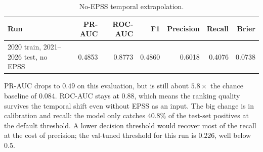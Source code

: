 \documentclass[11pt]{article}
\begin{document}
\begin{table}[h]
\centering
\small
\begin{tabular}{lrrrrrr}
\toprule
Run & PR-AUC & ROC-AUC & F1 & Precision & Recall & Brier \\
\midrule
2020 train, 2021--2026 test, no EPSS & 0.4853 & 0.8773 & 0.4860 & 0.6018 & 0.4076 & 0.0738 \\
\bottomrule
\end{tabular}
\caption{No-EPSS temporal extrapolation.}
\end{table}

PR-AUC drops to $0.49$ on this evaluation, but is still about
$5.8\times$ the chance baseline of $0.084$. ROC-AUC stays at $0.88$,
which means the ranking quality survives the temporal shift even
without EPSS as an input. The big change is in calibration and recall:
the model only catches $40.8\%$ of the test-set positives at the
default threshold. A lower decision threshold would recover most of
the recall at the cost of precision; the val-tuned threshold for this
run is $0.226$, well below $0.5$.
\end{document}
